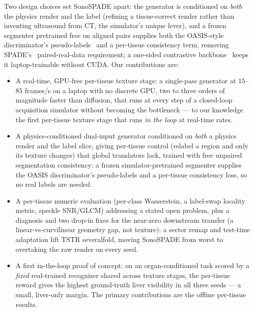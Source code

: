 \documentclass[runningheads]{llncs}
\begin{document}
Two design choices set SonoSPADE apart: the generator is conditioned on \emph{both} the physics render
and the label (refining a tissue-correct render rather than inventing ultrasound from CT, the
simulator's unique lever), and a frozen segmenter pretrained free on aligned pairs supplies both the
OASIS-style discriminator's pseudo-labels~\cite{sushko2021oasis} and a per-tissue consistency term,
removing SPADE's~\cite{park2019spade} paired-real-data requirement; a one-sided contrastive
backbone~\cite{park2020cut} keeps it laptop-trainable without CUDA. Our contributions are:
\begin{itemize}
\item A real-time, GPU-free per-tissue texture stage: a single-pass generator at $15$--$85$ frames/s on a
laptop with no discrete GPU, two to three orders of magnitude faster than diffusion, that runs at every
step of a closed-loop acquisition simulator without becoming the bottleneck --- to our knowledge the
first per-tissue texture stage that runs \emph{in the loop} at real-time rates.
\item A physics-conditioned dual-input generator conditioned on \emph{both} a physics render and the
label slice, giving per-tissue control (relabel a region and only its texture changes) that global
translators lack, trained with free unpaired segmentation consistency: a frozen simulator-pretrained
segmenter supplies the OASIS discriminator's pseudo-labels and a per-tissue consistency loss, so no real
labels are needed.
\item A per-tissue numeric evaluation (per-class Wasserstein, a label-swap locality metric, speckle
SNR/GLCM) addressing a stated open problem, plus a diagnosis and two drop-in fixes for the near-zero
downstream transfer (a linear-vs-curvilinear geometry gap, not texture): a sector remap and test-time
adaptation lift TSTR severalfold, moving SonoSPADE from worst to overtaking the raw render on every seed.
\item A first in-the-loop proof of concept: on an organ-conditioned task scored by a \emph{fixed}
real-trained recognizer shared across texture stages, the per-tissue reward gives the highest
ground-truth liver visibility in all three seeds --- a small, liver-only margin. The primary
contributions are the offline per-tissue results.
\end{itemize}
\end{document}
